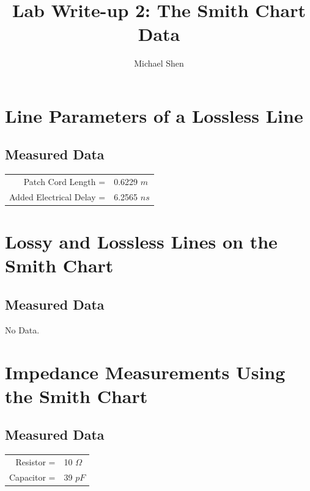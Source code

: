 \documentclass{article}
\begin{document}
\title{Lab Write-up 2: The Smith Chart Data}
\author{Michael Shen}
\date{}
\maketitle


\section{Line Parameters of a Lossless Line}

\subsection{Measured Data}

\begin{table}[h]
\centering
	\begin{tabular}{rl}
	Patch Cord Length =  	  & 0.6229 $m$  \\
	Added Electrical Delay =  & 6.2565 $ns$
	\end{tabular}
\end{table}

\section{Lossy and Lossless Lines on the Smith Chart}
\subsection{Measured Data}
No Data.


\section{Impedance Measurements Using the Smith Chart}

\subsection{Measured Data}
\begin{table}[H]
\centering
	\begin{tabular}{rl}
	Resistor =   & 10 $\Omega$  \\
	Capacitor =  & 39 $pF$
	\end{tabular}
\end{table}
\end{document}
